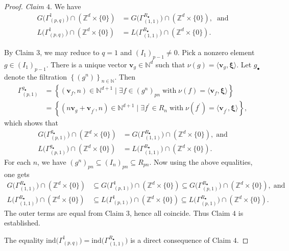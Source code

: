 \documentclass[10pt,a4paper]{amsart}
\begin{document}
\begin{proof}
\vspace{0.2cm}
\noindent
\emph{Claim $4$}. We have
\begin{align*}
G\big(\Gamma^{\mathbb{I}}_{(p,q)}\big) \cap \left(\mathbb{Z}^d\times \{0\}\right) &= G\big(\Gamma^{R_{\bullet}}_{(1,1)}\big) \cap \left(\mathbb{Z}^d\times \{0\}\right),\;\;\text{and}\\
L\big(\Gamma^{\mathbb{I}}_{(p,q)}\big) \cap \left(\mathbb{Z}^d\times \{0\}\right) &= L\big(\Gamma^{R_{\bullet}}_{(1,1)}\big) \cap \left(\mathbb{Z}^d\times \{0\}\right).
\end{align*}

By Claim $3$, we may reduce to $q=1$ and $(I_1)_{p-1}\neq 0$. Pick a nonzero element $g \in {\left(I_{1}\right)}_{p-1}$. There is a unique vector $\mathbf{v}_g \in \mathbb{N}^d$ such that $\nu(g) = \langle \mathbf{v}_g, \boldsymbol{\xi}\rangle$. Let $g_{\bullet}$ denote the filtration $\left\{(g^n)\right\}_{n\in\mathbb{N}}$. Then
\begin{align*}
\Gamma^{g_{\bullet}}_{(p,1)} &= \left\{(\mathbf{v}_f,n)\in\mathbb{N}^{d+1} \mid \exists f \in {(g^{n})}_{pn}\;\text{with}\;\nu(f) = \langle \mathbf{v}_f, \boldsymbol{\xi} \rangle\right\}\\
  &= \left\{(n\mathbf{v}_g + \mathbf{v}_{f^{\prime}},n)\in\mathbb{N}^{d+1} \mid \exists f^{\prime} \in {R}_{n}\;\text{with}\;\nu(f^{\prime}) = \langle \mathbf{v}_{f^{\prime}}, \boldsymbol{\xi} \rangle\right\},
\end{align*}
which shows that
\begin{align*}
 G\big(\Gamma^{g_{\bullet}}_{(p,1)}\big)\cap \left(\mathbb{Z}^d\times \{0\}\right) &= G\big(\Gamma^{R_{\bullet}}_{(1,1)}\big)\cap \left(\mathbb{Z}^d\times \{0\}\right),\;\text{and}\\
  L\big(\Gamma^{g_{\bullet}}_{(p,1)}\big)\cap \left(\mathbb{Z}^d\times \{0\}\right) &= L\big(\Gamma^{R_{\bullet}}_{(1,1)}\big)\cap \left(\mathbb{Z}^d\times \{0\}\right).
 \end{align*}
For each $n$, we have $(g^n)_{pn} \subseteq (I_n)_{pn} \subseteq R_{pn}$. Now using the above equalities, one gets
\begin{align*}
 G\big(\Gamma^{R_{\bullet}}_{(1,1)}\big)\cap \left(\mathbb{Z}^d\times \{0\}\right) &\subseteq G\big(\Gamma^{\mathbb{I}}_{(p,1)}\big)\cap \left(\mathbb{Z}^d\times \{0\}\right) \subseteq G\big(\Gamma^{R_{\bullet}}_{(p,1)}\big)\cap \left(\mathbb{Z}^d\times \{0\}\right),\;\text{and}\\
 L\big(\Gamma^{R_{\bullet}}_{(1,1)}\big)\cap \left(\mathbb{Z}^d\times \{0\}\right) &\subseteq L\big(\Gamma^{\mathbb{I}}_{(p,1)}\big)\cap \left(\mathbb{Z}^d\times \{0\}\right) \subseteq L\big(\Gamma^{R_{\bullet}}_{(p,1)}\big)\cap \left(\mathbb{Z}^d\times \{0\}\right).
\end{align*}
The outer terms are equal from Claim $3$, hence all coincide. Thus Claim $4$ is established.

The equality $\mathrm{ind}\big(\Gamma^{\mathbb{I}}_{(p,q)}\big) = \mathrm{ind}\big(\Gamma^{R_{\bullet}}_{(1,1)}\big)$ is a direct consequence of Claim $4$.
\end{proof}
\end{document}
